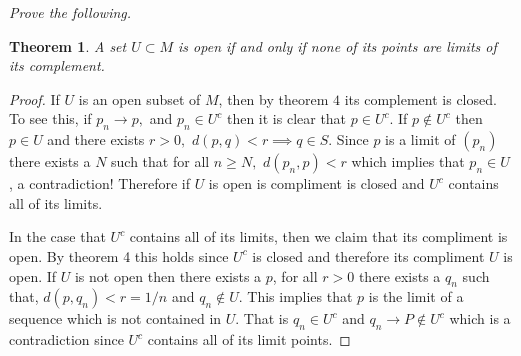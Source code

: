 \documentclass[letter]{article}
\newtheorem{theorem}{Theorem}
\newenvironment{menumerate}{%
  \edef\backupindent{\the\parindent}%
  \enumerate%
  \setlength{\parindent}{\backupindent}%
}{\endenumerate}
\begin{document}
\begin{menumerate}
		\setcounter{enumi}{25}
		\item \textit{Prove the following.}
			\begin{theorem}
			 	A set $U \subset M$ is open if and only if none of its points are limits of its complement.
			 \end{theorem} 
			 \begin{proof}
			 If $U$ is an open subset of $M$, then by theorem $4$ its complement is closed. To see this, if $p_n \to p,$ and $p_n \in U^c$ then it is clear that $p \in U^c.$ If $p \notin U^c$ then $p \in U$ and there exists $r >0,$ $d(p,q) < r \implies q \in S.$ Since $p$ is a limit of $(p_n)$ there exists a $N$ such that for all $n \geq N,$ $d(p_n,p) <r$ which implies that $p_n \in U$, a contradiction! Therefore if $U$ is open is compliment is closed and $U^c$ contains all of its limits.

			 In the case that $U^c$ contains all of its limits, then we claim that its compliment is open. By theorem 4 this holds since $U^c$ is closed and therefore its compliment $U$ is open. If $U$ is not open then there exists a $p$, for all $r >0$ there exists a $q_n$ such that, $d(p,q_n) < r=1/n$ and $q_n \notin U.$ This implies that $p$ is the limit of a sequence which is not contained in $U$. That is $q_n \in U^c$ and $q_n \to P \notin U^c$ which is a contradiction since $U^c$ contains all of its limit points. 


\end{proof}
\end{menumerate}
\end{document}
